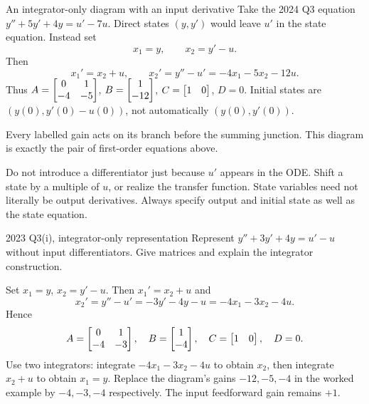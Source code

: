 \begin{worked}{An integrator-only diagram with an input derivative}
Take the 2024 Q3 equation $y''+5y'+4y=u'-7u$. Direct states $(y,y')$ would leave $u'$ in the state equation. Instead set
\[x_1=y,\qquad x_2=y'-u.\]
Then
\[x_1'=x_2+u,\qquad x_2'=y''-u'=-4x_1-5x_2-12u.\]
Thus $A=\begin{bmatrix}0&1\\-4&-5\end{bmatrix}$, $B=\begin{bmatrix}1\\-12\end{bmatrix}$, $C=\begin{bmatrix}1&0\end{bmatrix}$, $D=0$. Initial states are $(y(0),y'(0)-u(0))$, not automatically $(y(0),y'(0))$.

\begin{center}
\end{center}
Every labelled gain acts on its branch before the summing junction. This diagram is exactly the pair of first-order equations above.
\end{worked}
\begin{tip}
Do not introduce a differentiator just because $u'$ appears in the ODE. Shift a state by a multiple of $u$, or realize the transfer function. State variables need not literally be output derivatives. Always specify output and initial state as well as the state equation.
\end{tip}
\begin{question}{2023 Q3(i), integrator-only representation}
Represent $y''+3y'+4y=u'-u$ without input differentiators. Give matrices and explain the integrator construction.
\end{question}
\begin{answer}
Set $x_1=y$, $x_2=y'-u$. Then $x_1'=x_2+u$ and
\[x_2'=y''-u'=-3y'-4y-u=-4x_1-3x_2-4u.\]
Hence
\[A=\begin{bmatrix}0&1\\-4&-3\end{bmatrix},\quad B=\begin{bmatrix}1\\-4\end{bmatrix},\quad C=\begin{bmatrix}1&0\end{bmatrix},\quad D=0.\]
Use two integrators: integrate $-4x_1-3x_2-4u$ to obtain $x_2$, then integrate $x_2+u$ to obtain $x_1=y$. Replace the diagram's gains $-12,-5,-4$ in the worked example by $-4,-3,-4$ respectively. The input feedforward gain remains $+1$.
\end{answer}

